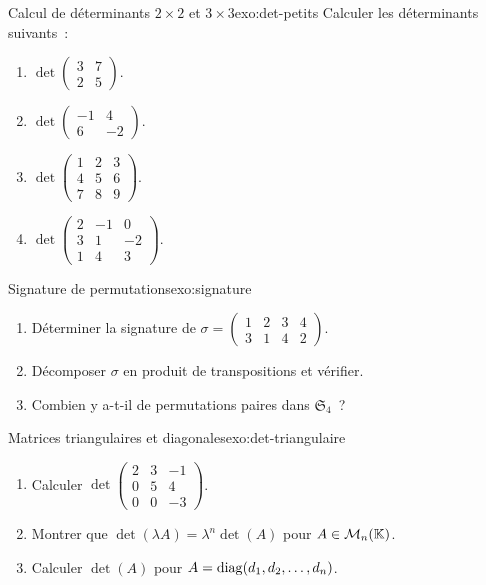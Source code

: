 \begin{exercise}{\basic{} Calcul de déterminants $2\times 2$ et $3\times 3$}{exo:det-petits}
  Calculer les déterminants suivants~:
  \begin{enumerate}[label=(\alph*)]
    \item $\det\begin{pmatrix}3&7\\2&5\end{pmatrix}$.
    \item $\det\begin{pmatrix}-1&4\\6&-2\end{pmatrix}$.
    \item $\det\begin{pmatrix}1&2&3\\4&5&6\\7&8&9\end{pmatrix}$.
    \item $\det\begin{pmatrix}2&-1&0\\3&1&-2\\1&4&3\end{pmatrix}$.
  \end{enumerate}
\end{exercise}

\begin{exercise}{\basic{} Signature de permutations}{exo:signature}
  \begin{enumerate}[label=(\alph*)]
    \item Déterminer la signature de $\sigma=\begin{pmatrix}1&2&3&4\\
      3&1&4&2\end{pmatrix}$.
    \item Décomposer $\sigma$ en produit de transpositions et vérifier.
    \item Combien y a-t-il de permutations paires dans $\mathfrak{S}_4$~?
  \end{enumerate}
\end{exercise}

\begin{exercise}{\basic{} Matrices triangulaires et diagonales}{exo:det-triangulaire}
  \begin{enumerate}[label=(\alph*)]
    \item Calculer $\det\begin{pmatrix}2&3&-1\\0&5&4\\0&0&-3\end{pmatrix}$.
    \item Montrer que $\det(\lambda A)=\lambda^n\det(A)$ pour
      $A\in\mathcal{M}_n({\mathbb{K}})$.
    \item Calculer $\det(A)$ pour
      $A=\operatorname{diag}(d_1,d_2,\ldots,d_n)$.
  \end{enumerate}
\end{exercise}

